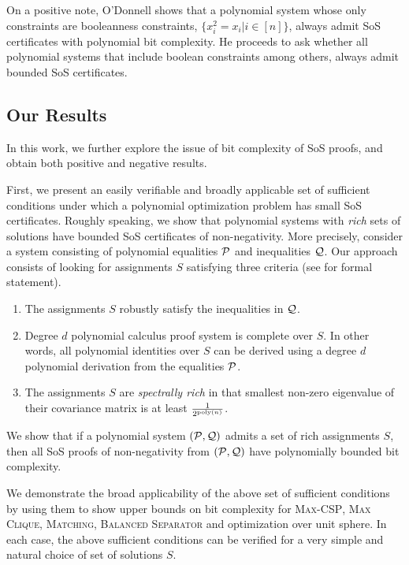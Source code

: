 On a positive note, O'Donnell shows that a polynomial system whose only constraints are booleanness constraints, $\{x_i^2 = x_i | i \in [n]\}$, always admit SoS certificates with polynomial bit complexity.  
%
He proceeds to ask whether all polynomial systems that include boolean constraints among others, always admit bounded SoS certificates.


\subsection{Our Results}

In this work, we further explore the issue of bit complexity of SoS proofs, and obtain both positive and negative results.
%

First, we present an easily verifiable and broadly applicable set of sufficient conditions under which a polynomial optimization problem has small SoS certificates.
%
Roughly speaking, we show that polynomial systems with {\it rich} sets of solutions have bounded SoS certificates of non-negativity.
%
More precisely, consider a system consisting of polynomial equalities $\mathcal P$ and inequalities $\mathcal Q$.  Our approach consists of looking for assignments $S$ satisfying three criteria (see  for formal statement).  
\begin{enumerate}
\item The assignments $S$ robustly satisfy the inequalities in $\mathcal Q$.  
\item Degree $d$ polynomial calculus proof system is complete over $S$.  In other words, all polynomial identities over $S$ can be derived using a degree $d$ polynomial derivation from the equalities $\mathcal P$.
\item The assignments $S$ are {\it spectrally rich} in that smallest non-zero eigenvalue of their covariance matrix is at least $\frac{1}{2^{\operatorname{poly}(n)}}$. 
\end{enumerate}
We show that if a polynomial system $(\mathcal P,\mathcal Q)$ admits a set of rich assignments $S$, then all SoS proofs of non-negativity from $(\mathcal P, \mathcal Q)$ have polynomially bounded bit complexity. 

We demonstrate the broad applicability of the above set of sufficient conditions by using them to show upper bounds on bit complexity for \textsc{Max-CSP}, \textsc{Max Clique}, \textsc{Matching}, \textsc{Balanced Separator} and optimization over unit sphere.  In each case, the above sufficient conditions can be verified for a very simple and natural choice of set of solutions $S$. 
%

